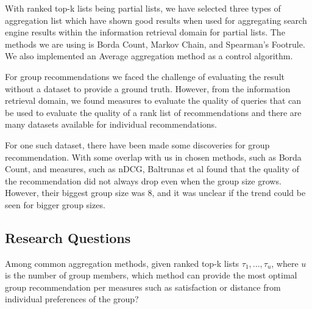 With ranked top-k lists being partial lists, we have selected three types of aggregation list which have shown good results when used for aggregating search engine results within the information retrieval domain for partial lists. The methods we are using is Borda Count, Markov Chain, and Spearman's Footrule\cite{Masthoff2004, rank:aggregation}. We also implemented an Average aggregation method as a control algorithm\cite{Masthoff2004}.

For group recommendations we faced the challenge of evaluating the result without a dataset to provide a ground truth. However, from the information retrieval domain, we found measures to evaluate the quality of queries that can be used to evaluate the quality of a rank list of recommendations and there are many datasets available for individual recommendations.

For one such dataset, there have been made some discoveries for group recommendation. With some overlap with us in chosen methods, such as Borda Count, and measures, such as nDCG, Baltrunas et al found that the quality of the recommendation did not always drop even when the group size grows\citep{Baltrunas:2010:GRR:1864708.1864733}. However, their biggest group size was 8, and it was unclear if the trend could be seen for bigger group sizes.


\subsection{Research Questions}
Among common aggregation methods, given ranked top-k lists $\tau_1, ... , \tau_u$, where $u$ is the number of group members, which method can provide the most optimal group recommendation per measures such as satisfaction or distance from individual preferences of the group?


